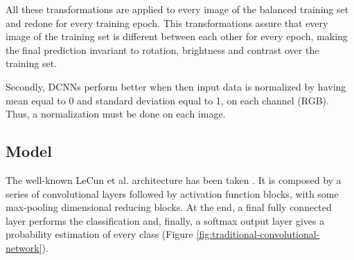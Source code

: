 All these transformations are applied to every image of the balanced training set and redone for every training epoch. This transformations assure that every image of the training set is different between each other for every epoch, making the final prediction invariant to rotation, brightness and contrast over the training set.

Secondly, DCNNs perform better when then input data is normalized by having mean equal to 0 and standard deviation equal to 1, on each channel (RGB). Thus, a normalization must be done on each image.

\subsection {Model}

The well-known LeCun et al. architecture has been taken \citep{LeCun:98}. It is composed by a series of convolutional layers followed by activation function blocks, with some max-pooling dimensional reducing blocks. At the end, a final fully connected layer performs the classification and, finally, a softmax output layer gives a probability estimation of every class  (Figure \ref{fig:traditional-convolutional-network}). 


